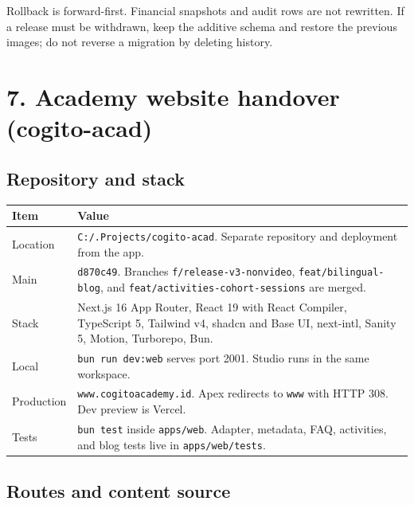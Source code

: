 \documentclass[11pt,a4paper]{article}
\newcommand{\code}[1]{\texttt{#1}}
\begin{document}
Rollback is forward-first. Financial snapshots and audit rows are not rewritten. If a release must be withdrawn, keep the additive schema and restore the previous images; do not reverse a migration by deleting history.

\section{7. Academy website handover (cogito-acad)}

\subsection{Repository and stack}

\begin{tabular}{@{}L{3.6cm}L{12.0cm}@{}}
\toprule
\textbf{Item} & \textbf{Value} \\
\midrule
Location & \code{C:/.Projects/cogito-acad}. Separate repository and deployment from the app. \\
Main & \code{d870c49}. Branches \code{f/release-v3-nonvideo}, \code{feat/bilingual-blog}, and \code{feat/activities-cohort-sessions} are merged. \\
Stack & Next.js 16 App Router, React 19 with React Compiler, TypeScript 5, Tailwind v4, shadcn and Base UI, next-intl, Sanity 5, Motion, Turborepo, Bun. \\
Local & \code{bun run dev:web} serves port 2001. Studio runs in the same workspace. \\
Production & \code{www.cogitoacademy.id}. Apex redirects to \code{www} with HTTP 308. Dev preview is Vercel. \\
Tests & \code{bun test} inside \code{apps/web}. Adapter, metadata, FAQ, activities, and blog tests live in \code{apps/web/tests}. \\
\bottomrule
\end{tabular}

\subsection{Routes and content source}
\end{document}
